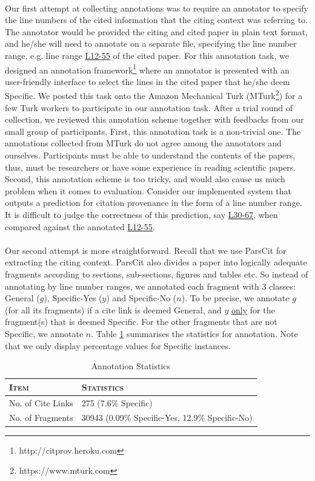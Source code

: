 \paragraph{}
Our first attempt at collecting annotations was to require an annotator to specify the line numbers of the cited information that the citing context was referring to. The annotator would be provided the citing and cited paper in plain text format, and he/she will need to annotate on a separate file, specifying the line number range, e.g. line range \url{L12-55} of the cited paper. For this annotation task, we designed an annotation framework\footnote{http://citprov.heroku.com} where an annotator is presented with an user-friendly interface to select the lines in the cited paper that he/she deem Specific. We posted this task onto the Amazon Mechanical Turk (MTurk\footnote{https://www.mturk.com}) for a few Turk workers to participate in our annotation task. After a trial round of collection, we reviewed this annotation scheme together with feedbacks from our small group of participants. First, this annotation task is a non-trivial one. The annotations collected from MTurk do not agree among the annotators and ourselves. Participants must be able to understand the contents of the papers, thus, must be researchers or have some experience in reading scientific papers. Second, this annotation scheme is too tricky, and would also cause us much problem when it comes to evaluation. Consider our implemented system that outputs a prediction for citation provenance in the form of a line number range. It is difficult to judge the correctness of this prediction, say \url{L30-67}, when compared against the annotated \url{L12-55}.

\paragraph{}
Our second attempt is more straightforward. Recall that we use ParsCit for extracting the citing context. ParsCit also divides a paper into logically adequate fragments according to sections, sub-sections, figures and tables etc. So instead of annotating by line number ranges, we annotated each fragment with 3 classes: General ($g$), Specific-Yes ($y$) and Specific-No ($n$). To be precise, we annotate $g$ (for all its fragments) if a cite link is deemed General, and $y$ \underline{only} for the fragment(s) that is deemed Specific. For the other fragments that are not Specific, we annotate $n$. Table \ref{tab:annotation} summarises the statistics for annotation. Note that we only display percentage values for Specific instances.
\begin{table}[h]
	\center
	\begin{tabular}{ l | l}
		\textsc{Item} & \textsc{Statistics}\\
		\hline
		No. of Cite Links & 275 (7.6\% Specific) \\
		No. of Fragments & 30943 (0.09\% Specific-Yes, 12.9\% Specific-No)
	\end{tabular}
	\caption{Annotation Statistics}
	\label{tab:annotation}
\end{table}

